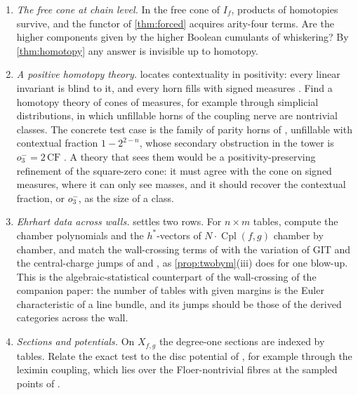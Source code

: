 \documentclass[11pt]{article}
\theoremstyle{definition}
\theoremstyle{remark}
\newcommand{\Cpl}{\operatorname{Cpl}}
\begin{document}
\begin{enumerate}[leftmargin=*]
\item \emph{The free cone at chain level.} In the free cone of $I_f$, products of homotopies survive, and the functor of
  \cref{thm:forced} acquires arity-four terms. Are the higher components given by the higher Boolean cumulants of
  whiskering? By \cref{thm:homotopy} any answer is invisible up to homotopy.
\item \emph{A positive homotopy theory.}  locates contextuality in positivity: every linear invariant is blind
  to it, and every horn fills with signed measures \cite[Prop.~35.1]{ThreeLayers}. Find a homotopy theory of cones of
  measures, for example through simplicial distributions, in which unfillable horns of the coupling nerve
  \cite[\S4]{Conditionals} are nontrivial classes. The concrete test case is the family of parity horns of
  \cite[Thm.~4.3]{Conditionals}, unfillable with contextual fraction $1-2^{2-n}$, whose secondary obstruction in the tower is
  $o_3^-=2\,\mathrm{CF}$ \cite[Thm.~11.2]{Conditionals}. A theory that sees them would be a positivity-preserving refinement of the
  square-zero cone: it must agree with the cone on signed measures, where it can only see masses, and it should recover the
  contextual fraction, or $o_3^-$, as the size of a class.
\item \emph{Ehrhart data across walls.}  settles two rows. For $n\times m$ tables, compute the chamber
  polynomials and the $h^*$-vectors of $N\cdot\Cpl(f,g)$ chamber by chamber, and match the wall-crossing terms of
  \cite{BoysalVergne2009} with the variation of GIT and the central-charge jumps of \cite[\S10]{Conditionals} and
  \cite[\S3]{Family}, as \cref{prop:twobym}(iii) does for one blow-up. This is the algebraic-statistical counterpart of the
  wall-crossing of the companion paper: the number of tables with given margins is the Euler characteristic of a line
  bundle, and its jumps should be those of the derived categories across the wall.
\item \emph{Sections and potentials.} On $X_{f,g}$ the degree-one sections are indexed by tables. Relate the exact test to
  the disc potential of \cite[\S7]{Conditionals}, for example through the leximin coupling, which lies over the
  Floer-nontrivial fibres at the sampled points of \cite[Obs.~10.10]{Conditionals}.
\end{enumerate}

\end{document}
